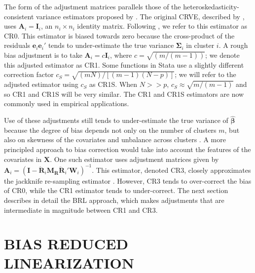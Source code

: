 \documentclass[12pt]{article}\usepackage[]{graphicx}\usepackage[]{color}
\newcommand{\bm}{\mathbf}
\newcommand{\bs}{\boldsymbol}
\begin{document}
The form of the adjustment matrices parallels those of the heteroskedasticity-consistent variance estimators proposed by \citet*{MacKinnon1985some}. 
The original CRVE, described by \citet{Liang1986longitudinal}, uses $\bm{A}_i = \bm{I}_i$, an $n_i \times n_i$ identity matrix. 
Following \citet{Cameron2015practitioners}, we refer to this estimator as CR0. 
This estimator is biased towards zero because the cross-product of the residuals $\bm{e}_i \bm{e}_i'$ tends to under-estimate the true variance $\bs\Sigma_i$ in cluster $i$.
A rough bias adjustment is to take $\bm{A}_i = c\bm{I}_i$, where $c = \sqrt{(m/(m-1))}$; we denote this adjusted estimator as CR1. Some functions in Stata use a slightly different correction factor $c_S = \sqrt{(m N)/[(m - 1)(N - p)]}$; we will refer to the adjusted estimator using $c_S$ as CR1S. When $N >> p$, $c_S \approx \sqrt{m/(m-1)}$ and so CR1 and CR1S will be very similar.
The CR1 and CR1S estimators are now commonly used in empirical applications.

Use of these adjustments still tends to under-estimate the true variance of $\hat{\bs\beta}$ because the degree of bias depends not only on the number of clusters $m$, but also on skewness of the covariates and unbalance across clusters \citep{Carter2013asymptotic, MacKinnon2013thirty, Cameron2015practitioners, Young2016improved}. 
A more principled approach to bias correction would take into account the features of the covariates in $\bm{X}$. 
One such estimator uses adjustment matrices given by $\bm{A}_i = \left(\bm{I} - \bm{\ddot{R}}_i \bm{M_{\ddot{R}}}\bm{\ddot{R}}_i'\bm{W}_i\right)^{-1}$. This estimator, denoted CR3, closely approximates the jackknife re-sampling estimator \citep{Bell2002bias, Mancl2001covariance}.  
However, CR3 tends to over-correct the bias of CR0, while the CR1 estimator tends to under-correct. 
The next section describes in detail the BRL approach, which makes adjustments that are intermediate in magnitude between CR1 and CR3. 


\section{BIAS REDUCED LINEARIZATION}
\label{sec:BRL}
\end{document}
